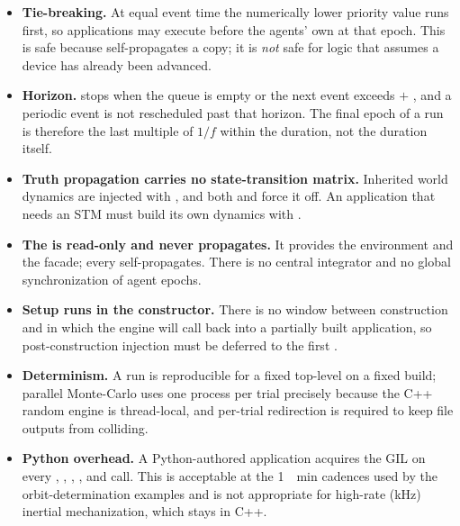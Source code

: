 \begin{itemize}[leftmargin=*]
  \item \textbf{Tie-breaking.} At equal event time the numerically lower priority
    value runs first, so applications may execute before the agents' own
     at that epoch. This is safe because 
    self-propagates a copy; it is \emph{not} safe for logic that assumes a device
    has already been advanced.
  \item \textbf{Horizon.}  stops when the queue is empty or the next event
    exceeds  $+$ , and a periodic event is not
    rescheduled past that horizon. The final epoch of a run is therefore the last
    multiple of $1/f$ within the duration, not the duration itself.
  \item \textbf{Truth propagation carries no state-transition matrix.} Inherited
    world dynamics are injected with , and both
     and  force it off. An
    application that needs an STM must build its own dynamics with
    .
  \item \textbf{The  is read-only and never propagates.} It provides
    the environment and the  facade; every
     self-propagates. There is no central integrator and no
    global synchronization of agent epochs.
  \item \textbf{Setup runs in the constructor.} There is no window between
    construction and  in which the engine will call back into a
    partially built application, so post-construction injection must be deferred
    to the first .
  \item \textbf{Determinism.} A run is reproducible for a fixed top-level
     on a fixed build; parallel Monte-Carlo uses one process per trial
    precisely because the C++ random engine is thread-local, and per-trial
     redirection is required to keep file outputs from
    colliding.
  \item \textbf{Python overhead.} A Python-authored application acquires the GIL on
    every , , , , and 
    call. This is acceptable at the \SI{1}{\per\minute} cadences used by the
    orbit-determination examples and is not appropriate for high-rate
    (\si{\kilo\hertz}) inertial mechanization, which stays in C++.
\end{itemize}
